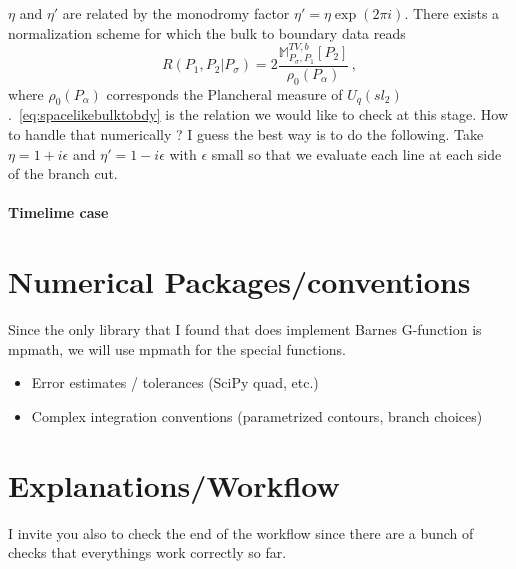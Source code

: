 \documentclass[11pt]{article}
\begin{document}
$\eta$ and $\eta'$ are related by the monodromy factor $\eta' = \eta \exp(2\pi i)$. There exists a normalization scheme for which the bulk to boundary data reads
\begin{equation}
    R(P_1, P_2 | P_\sigma) = 2 \frac{\mathbb{M}^{TV, b}_{P_\sigma,P_1}[P_2]}{\rho_{0}(P_{\alpha})}\,,
\end{equation}
where $\rho_0(P_\alpha)$ corresponds the Plancheral measure of $U_q(sl_2)$.~\eqref{eq:spacelikebulktobdy} is the relation we would like to check at this stage. How to handle that numerically ? I guess the best way is to do the following. Take $\eta = 1+ i \epsilon$ and $\eta' = 1 - i \epsilon$ with $\epsilon$ small so that we evaluate each line at each side of the branch cut.
\paragraph{Timelime case}
\section{Numerical Packages/conventions}
Since the only library that I found that does implement Barnes G-function is mpmath, we will use mpmath for the special functions.
\begin{itemize}[leftmargin=*]
    \item Error estimates / tolerances (SciPy quad, etc.)
    \item Complex integration conventions (parametrized contours, branch choices)
\end{itemize}

\section{Explanations/Workflow}
I invite you also to check the end of the workflow since there are a bunch of checks that everythings work correctly so far.
\end{document}
